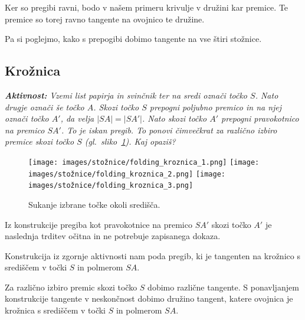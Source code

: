 \begin{opomba}
    Ker so pregibi ravni, bodo v našem primeru krivulje v družini kar premice. Te premice so torej ravno tangente na ovojnico te družine.
\end{opomba}

Pa si poglejmo, kako s prepogibi dobimo tangente na vse štiri stožnice.

\subsection{Krožnica}


\textit{\textbf{Aktivnost:} Vzemi list papirja in svinčnik ter na sredi označi točko $S$. Nato drugje označi še točko $A$. Skozi točko $S$ prepogni poljubno premico in na njej označi točko $A'$, da velja $|SA| = |SA'|$. Nato skozi točko $A'$ prepogni pravokotnico na premico $SA'$. To je iskan pregib. To ponovi čimvečkrat za različno izbiro premice skozi točko $S$ (gl.\ sliko~\ref{fig:koraki_kroznica}). Kaj opaziš?}

\begin{figure}[h]
    \centering
    \texttt{[image: images/stožnice/folding\_kroznica\_1.png]}
    \texttt{[image: images/stožnice/folding\_kroznica\_2.png]}
    \texttt{[image: images/stožnice/folding\_kroznica\_3.png]}
    \caption[Prepogibanje krožnice]{Sukanje izbrane točke okoli središča.}
    \label{fig:koraki_kroznica}
\end{figure}


Iz konstrukcije pregiba kot pravokotnice na premico $SA'$ skozi točko $A'$ je naslednja trditev očitna in ne potrebuje zapisanega dokaza.

\begin{trditev}
    Konstrukcija iz zgornje aktivnosti nam poda pregib, ki je tangenten na krožnico s središčem v točki $S$ in polmerom $SA$.
\end{trditev}

Za različno izbiro premic skozi točko $S$ dobimo različne tangente. S ponavljanjem konstrukcije tangente v neskončnost dobimo družino tangent, katere ovojnica je krožnica s središčem v točki $S$ in polmerom $SA$.

